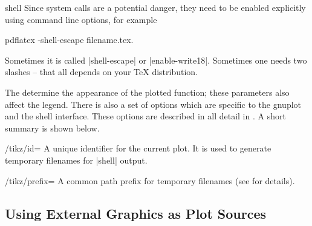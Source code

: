 {\begin{addplotoperation}[]{shell}{}
    Since system calls are a potential danger, they need to be enabled
    explicitly using command line options, for example
\begin{codeexample}
pdflatex -shell-escape filename.tex.
\end{codeexample}
    Sometimes it is called |shell-escape| or |enable-write18|. Sometimes one
    needs two slashes -- that all depends on your \TeX{} distribution.
\begin{codeexample}[]
\end{codeexample}

\begin{codeexample}[]
\end{codeexample}

    The  determine the appearance of the plotted function; these
    parameters also affect the legend. There is also a set of options which are
    specific to the gnuplot and the shell interface. These options are
    described in all detail in \cite[Section~19.6]{tikz}. A short summary is
    shown below.
\end{addplotoperation}

\begin{key}{/tikz/id=}
    A unique identifier for the current plot. It is used to generate temporary
    filenames for |shell| output.
\end{key}

\begin{key}{/tikz/prefix=}
    A common path prefix for temporary filenames (see \cite[section~19.6]{tikz}
    for details).
\end{key}


\subsection{Using External Graphics as Plot Sources}
{

}}
